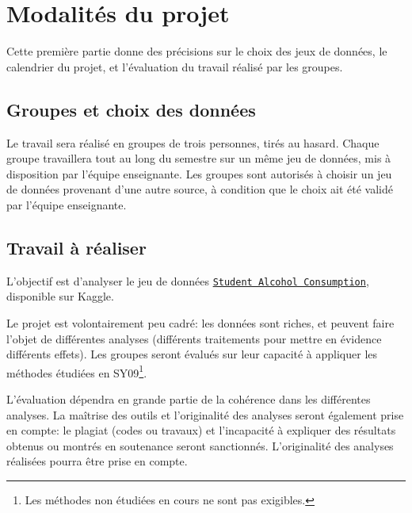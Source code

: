 \documentclass[twocolumn,10pt]{article}
\begin{document}

\section{Modalités du projet}\label{sec:proj}

Cette première partie donne des précisions sur le choix des jeux de données, le calendrier du projet, et l'évaluation du travail réalisé par les groupes. 



\subsection{Groupes et choix des données}\label{subsec:proj:groupes}

Le travail sera réalisé en groupes de trois personnes, tirés au hasard. 
Chaque groupe travaillera tout au long du semestre sur un même jeu de données, mis à disposition par l'équipe enseignante. 
Les groupes sont autorisés à choisir un jeu de données provenant d'une autre source, à condition que le choix ait été validé par l'équipe enseignante. 



\subsection{Travail à réaliser}\label{subsec:proj:travail}

L'objectif est d'analyser le jeu de données \href{https://www.kaggle.com/datasets/uciml/student-alcohol-consumption}{\texttt{Student Alcohol Consumption}}, disponible sur Kaggle. 

Le projet est volontairement peu cadré: les données sont riches, et peuvent faire l'objet de différentes analyses (différents traitements pour mettre en évidence différents effets). Les groupes seront évalués sur leur capacité à appliquer les méthodes étudiées en SY09\footnote{Les méthodes non étudiées en cours ne sont pas exigibles.}. 

L'évaluation dépendra en grande partie de la cohérence dans les différentes analyses. La maîtrise des outils et l'originalité des analyses seront également prise en compte: le plagiat (codes ou travaux) et l'incapacité à expliquer des résultats obtenus ou montrés en soutenance seront sanctionnés. L'originalité des analyses réalisées pourra être prise en compte. 
\end{document}

